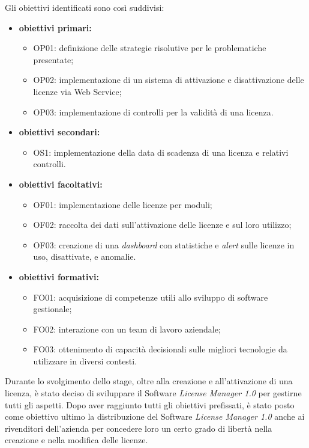 Gli obiettivi identificati sono così suddivisi:

\begin{itemize}

\item \textbf{obiettivi primari:}\begin{itemize}
\item OP01: definizione delle strategie risolutive per le problematiche presentate;
\item OP02: implementazione di un sistema di attivazione e disattivazione delle licenze via Web Service;
\item OP03: implementazione di controlli per la validità di una licenza.
\end{itemize}
\item \textbf{obiettivi secondari:}\begin{itemize}
\item OS1: implementazione della data di scadenza di una licenza e relativi controlli.
\end{itemize}
\item \textbf{obiettivi facoltativi:}\begin{itemize}
\item OF01: implementazione delle licenze per moduli;
\item OF02: raccolta dei dati sull’attivazione delle licenze e sul loro utilizzo;
\item OF03: creazione di una \textit{dashboard} con statistiche e \textit{alert} sulle licenze in uso, disattivate, e anomalie.
\end{itemize}
\item \textbf{obiettivi formativi:}\begin{itemize}
\item FO01: acquisizione di competenze utili allo sviluppo di software gestionale;
\item FO02: interazione con un team di lavoro aziendale;
\item FO03: ottenimento di capacità decisionali sulle migliori tecnologie da utilizzare in diversi contesti.
\end{itemize}

\end{itemize}

Durante lo svolgimento dello stage, oltre alla creazione e all'attivazione di una licenza, è stato deciso di sviluppare il Software \textit{License Manager 1.0} per gestirne tutti gli aspetti. Dopo aver raggiunto tutti gli obiettivi prefissati, è stato posto come obiettivo ultimo la distribuzione del Software \textit{License Manager 1.0} anche ai rivenditori dell'azienda per concedere loro un certo grado di libertà nella creazione e nella modifica delle licenze. 

